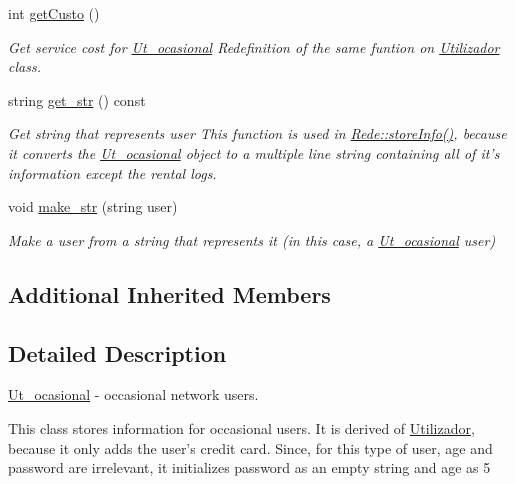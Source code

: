 \begin{DoxyCompactItemize}
\item 
int \hyperlink{class_ut__ocasional_a372c795cc67b402e54dc78e6e24c3779}{get\+Custo} ()
\begin{DoxyCompactList}\small\item\em Get service cost for \hyperlink{class_ut__ocasional}{Ut\+\_\+ocasional} Redefinition of the same funtion on \hyperlink{class_utilizador}{Utilizador} class. \end{DoxyCompactList}\item 
string \hyperlink{class_ut__ocasional_a500c4745815fed11a495c258a06f973a}{get\+\_\+str} () const 
\begin{DoxyCompactList}\small\item\em Get string that represents user This function is used in \hyperlink{class_rede_abec1da6660663cd58e6851737219959e}{Rede\+::store\+Info()}, because it converts the \hyperlink{class_ut__ocasional}{Ut\+\_\+ocasional} object to a multiple line string containing all of it's information except the rental logs. \end{DoxyCompactList}\item 
void \hyperlink{class_ut__ocasional_a215c8d086f1285c12e5bb8b42ccef682}{make\+\_\+str} (string user)
\begin{DoxyCompactList}\small\item\em Make a user from a string that represents it (in this case, a \hyperlink{class_ut__ocasional}{Ut\+\_\+ocasional} user) \end{DoxyCompactList}\end{DoxyCompactItemize}
\subsection*{Additional Inherited Members}


\subsection{Detailed Description}
\hyperlink{class_ut__ocasional}{Ut\+\_\+ocasional} -\/ occasional network users. 

This class stores information for occasional users. It is derived of \hyperlink{class_utilizador}{Utilizador}, because it only adds the user's credit card. Since, for this type of user, age and password are irrelevant, it initializes password as an empty string and age as 5 


